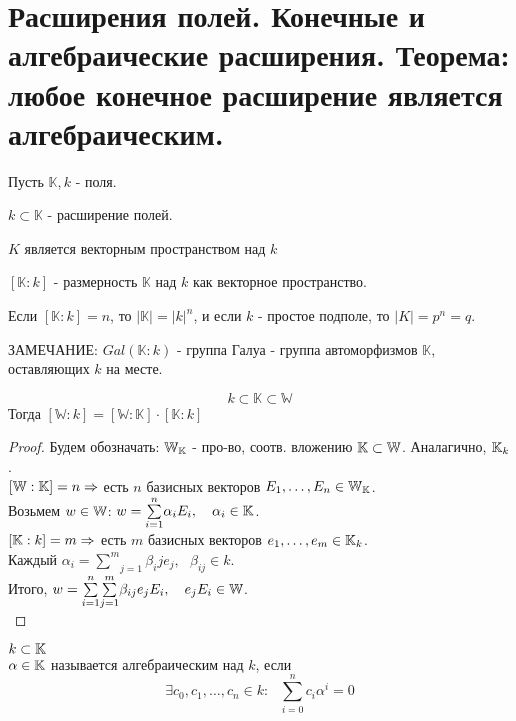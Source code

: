 \section{Расширения полей. Конечные и алгебраические расширения.
Теорема: любое конечное расширение является алгебраическим.}

Пусть $\mathbb{K}, k$ - поля.

\begin{defn}
$k \subset \mathbb{K}$ - расширение полей.
\end{defn}

$K$ является векторным пространством над $k$

\begin{defn} 
$[\mathbb{K}:k]$ - размерность $\mathbb{K}$ над $k$ как векторное пространство.
\end{defn}

Если $[\mathbb{K}:k] = n$, то $|\mathbb{K}| = |k|^n$, и если $k$ - простое подполе, то $|K| = p^n = q$.

ЗАМЕЧАНИЕ: $Gal(\mathbb{K}:k)$ - группа Галуа - группа автоморфизмов $\mathbb{K}$, оставляющих $k$ на месте.
\begin{thm}
\[k \subset \mathbb{K} \subset \mathbb{W}\]
Тогда $[\mathbb{W}:k] = [\mathbb{W}:\mathbb{K}] \cdot [\mathbb{K}:k]$
\end{thm}
\begin{proof}
Будем обозначать: $\mathbb{W}_{\mathbb{K}}$ - про-во, соотв. вложению $\mathbb{K} \subset \mathbb{W}$. Аналагично, $\mathbb{K}_k$.\\
$[\mathbb{W}:\mathbb{K}] = n \Rightarrow$ есть $n$ базисных векторов $E_1, \dots, E_n \in \mathbb{W}_{\mathbb{K}}$.\\
Возьмем $w \in \mathbb{W}$: $w = \underset{i = 1}{\overset{n}\sum}\alpha_iE_i,~~~\alpha_i \in \mathbb{K}$.\\

$[\mathbb{K}:k] = m \Rightarrow$ есть $m$ базисных векторов $e_1, \dots, e_m \in \mathbb{K}_k$.\\
Каждый $\alpha_i = \underset{j = 1}{\overset{m}\sum}\beta_ije_j,~~~\beta_{ij} \in k$.\\
Итого, $w = \underset{i = 1}{\overset{n}\sum}\underset{j = 1}{\overset{m}\sum}\beta_{ij} e_j E_i,~~~e_jE_i \in \mathbb{W}$.\\
\end{proof}

\begin{defn}
$k \subset \mathbb{K}$\\
$\alpha \in \mathbb{K}$ называется алгебраическим над $k$, если
\[\exists c_0, c_1, \dots, c_n \in k:~~~\underset{i = 0}{\overset{n}\sum}c_i\alpha^i = 0\]
\end{defn}

